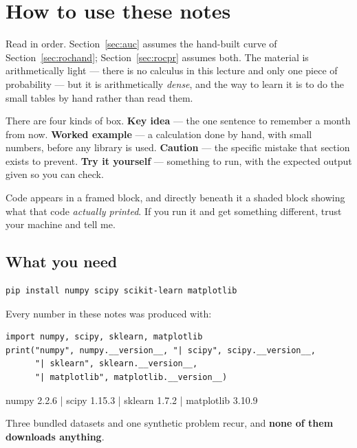\documentclass[11pt]{article}
\begin{document}
\section{How to use these notes}
\label{sec:how}

Read in order. Section~\ref{sec:auc} assumes the hand-built curve of
Section~\ref{sec:rochand}; Section~\ref{sec:rocpr} assumes both. The material
is arithmetically light --- there is no calculus in this lecture and only one
piece of probability --- but it is arithmetically \emph{dense}, and the way to
learn it is to do the small tables by hand rather than read them.

There are four kinds of box. \textbf{Key idea} --- the one sentence to remember
a month from now. \textbf{Worked example} --- a calculation done by hand, with
small numbers, before any library is used. \textbf{Caution} --- the specific
mistake that section exists to prevent. \textbf{Try it yourself} --- something
to run, with the expected output given so you can check.

Code appears in a framed block, and directly beneath it a shaded block showing
what that code \emph{actually printed}. If you run it and get something
different, trust your machine and tell me.

\subsection{What you need}

\begin{lstlisting}
pip install numpy scipy scikit-learn matplotlib
\end{lstlisting}

Every number in these notes was produced with:

\begin{lstlisting}
import numpy, scipy, sklearn, matplotlib
print("numpy", numpy.__version__, "| scipy", scipy.__version__,
      "| sklearn", sklearn.__version__,
      "| matplotlib", matplotlib.__version__)
\end{lstlisting}
\begin{codeout}
numpy 2.2.6 | scipy 1.15.3 | sklearn 1.7.2 | matplotlib 3.10.9
\end{codeout}

Three bundled datasets and one synthetic problem recur, and \textbf{none of
them downloads anything}.
\end{document}
